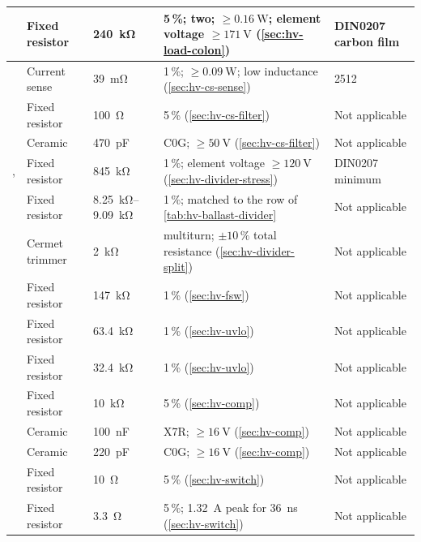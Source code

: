{\begin{longtable}{|L{0.11\textwidth}|L{0.13\textwidth}|L{0.10\textwidth}|L{0.33\textwidth}|L{0.13\textwidth}|}
  \hline
   & Fixed resistor & \SI{240}{\kilo\ohm} & 5\,\%; two; $\geq\SI{0.16}{\watt}$; element voltage $\geq\SI{171}{\volt}$ (\cref{sec:hv-load-colon}) & DIN0207 carbon film \\
  \hline
   & Current sense & \SI{39}{\milli\ohm} & 1\,\%; $\geq\SI{0.09}{\watt}$; low inductance (\cref{sec:hv-cs-sense}) & 2512 \\
  \hline
   & Fixed resistor & \SI{100}{\ohm} & 5\,\% (\cref{sec:hv-cs-filter}) & Not applicable \\
  \hline
   & Ceramic & \SI{470}{\pico\farad} & C0G; $\geq\SI{50}{\volt}$ (\cref{sec:hv-cs-filter}) & Not applicable \\
  \hline
  ,  & Fixed resistor & \SI{845}{\kilo\ohm} & 1\,\%; element voltage $\geq\SI{120}{\volt}$ (\cref{sec:hv-divider-stress}) & DIN0207 minimum \\
  \hline
   & Fixed resistor & \SIrange{8.25}{9.09}{\kilo\ohm} & 1\,\%; matched to the  row of \cref{tab:hv-ballast-divider} & Not applicable \\
  \hline
   & Cermet trimmer & \SI{2}{\kilo\ohm} & multiturn; $\pm10\,\%$ total resistance (\cref{sec:hv-divider-split}) & Not applicable \\
  \hline
   & Fixed resistor & \SI{147}{\kilo\ohm} & 1\,\% (\cref{sec:hv-fsw}) & Not applicable \\
  \hline
   & Fixed resistor & \SI{63.4}{\kilo\ohm} & 1\,\% (\cref{sec:hv-uvlo}) & Not applicable \\
  \hline
   & Fixed resistor & \SI{32.4}{\kilo\ohm} & 1\,\% (\cref{sec:hv-uvlo}) & Not applicable \\
  \hline
   & Fixed resistor & \SI{10}{\kilo\ohm} & 5\,\% (\cref{sec:hv-comp}) & Not applicable \\
  \hline
   & Ceramic & \SI{100}{\nano\farad} & X7R; $\geq\SI{16}{\volt}$ (\cref{sec:hv-comp}) & Not applicable \\
  \hline
   & Ceramic & \SI{220}{\pico\farad} & C0G; $\geq\SI{16}{\volt}$ (\cref{sec:hv-comp}) & Not applicable \\
  \hline
   & Fixed resistor & \SI{10}{\ohm} & 5\,\% (\cref{sec:hv-switch}) & Not applicable \\
  \hline
   & Fixed resistor & \SI{3.3}{\ohm} & 5\,\%; \SI{1.32}{\ampere} peak for \SI{36}{\nano\second} (\cref{sec:hv-switch}) & Not applicable \\

\end{longtable}}
